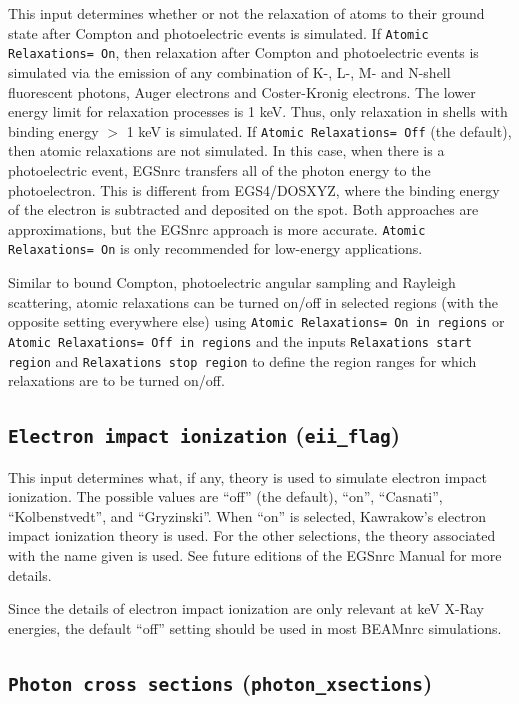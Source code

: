 \documentclass[12pt,twoside]{article}      %
\begin{document}
This input determines whether or not the relaxation of atoms to their
ground state after Compton and photoelectric events is simulated.
If {\tt Atomic Relaxations= On}, then relaxation after
Compton and photoelectric events is simulated via the
emission of any combination of K-, L-, M- and N-shell fluorescent photons, Auger electrons
and Coster-Kronig electrons.  The lower energy limit for relaxation processes
is 1 keV.  Thus, only relaxation in shells with binding energy $>$ 1 keV is
simulated.
If {\tt Atomic Relaxations= Off} (the default), then atomic relaxations
are not simulated.  In this case, when there is a
photoelectric event, EGSnrc transfers all of the photon energy to the
photoelectron.  This is different from EGS4/DOSXYZ, where the binding energy
of the electron is subtracted and deposited on the spot.  Both approaches
are approximations, but the EGSnrc approach is more accurate.
{\tt Atomic Relaxations= On} is only recommended for low-energy applications.

Similar to bound Compton, photoelectric angular sampling and
Rayleigh scattering, atomic relaxations can be turned on/off in
selected regions (with the opposite setting everywhere else) using
{\tt Atomic Relaxations= On in regions} or
{\tt Atomic Relaxations= Off in regions} and the inputs
{\tt Relaxations start region} and {\tt Relaxations stop region} to define
the region ranges for which relaxations are to be turned on/off.

\subsection{ {\tt Electron impact ionization} ({\tt eii\_flag})}

This input determines what, if any, theory is used to simulate
electron impact ionization.  The possible values are
``off'' (the default), ``on'', ``Casnati'', ``Kolbenstvedt'',
and ``Gryzinski''.  When ``on'' is selected, Kawrakow's electron
impact ionization theory\cite{Ka02b} is used.  For the other selections,
the theory associated with the name given is used.  See future editions
of the EGSnrc Manual\cite{KR03} for more details.

Since the details of electron impact ionization are only relevant
at keV X-Ray energies, the default ``off'' setting should be used
in most BEAMnrc simulations.

\subsection{ {\tt Photon cross sections} ({\tt photon\_xsections})}
\end{document}

